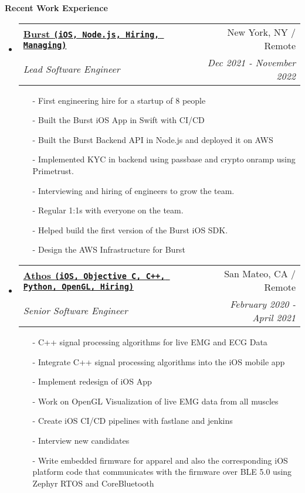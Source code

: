 \documentclass[letterpaper,11pt]{article}
\makeatletter
\newcommand{\resheading}[1]{{\large \colorbox{mygrey}{\begin{minipage}{\textwidth}{\textbf{#1 \vphantom{p\^{E}}}}\end{minipage}}}}
\newcommand{\ressubheading}[4]{
\begin{tabular*}{7.0in}{l@{\extracolsep{\fill}}r}
    \textbf{#1} & #2 \\
    \textit{#3} & \textit{#4} \\
\end{tabular*}\vspace{-6pt}}
\makeatother
\begin{document}
\resheading{Recent Work Experience}
\begin{itemize}

\item
    \ressubheading{\href{https://www.joinburst.com}{Burst \texttt{(iOS, Node.js, Hiring, Managing)}}}{New York, NY / Remote}{Lead Software Engineer}{Dec 2021 - November 2022 }
    \begin{itemize}
        \item[-]{First engineering hire for a startup of 8 people}
        \item[-]{Built the Burst iOS App in Swift with CI/CD}
        \item[-]{Built the Burst Backend API in Node.js and deployed it on AWS}
        \item[-]{Implemented KYC in backend using passbase and crypto onramp using Primetrust.}
        \item[-]{Interviewing and hiring of engineers to grow the team.}
        \item[-]{Regular 1:1s with everyone on the team.}
        \item[-]{Helped build the first version of the Burst iOS SDK.}
        \item[-]{Design the AWS Infrastructure for Burst}
    \end{itemize}


\item
    \ressubheading{\href{https://www.crunchbase.com/organization/athos}{Athos \texttt{(iOS, Objective C, C++, Python, OpenGL, Hiring)}}}{San Mateo, CA / Remote}{Senior Software Engineer}{February 2020 - April 2021}
    \begin{itemize}
        \item[-]{C++ signal processing algorithms for live EMG and ECG Data}
        \item[-]{Integrate C++ signal processing algorithms into the iOS mobile app}
        \item[-]{Implement redesign of iOS App}
        \item[-]{Work on OpenGL Visualization of live EMG data from all muscles}
        \item[-]{Create iOS CI/CD pipelines with fastlane and jenkins}
        \item[-]{Interview new candidates}
        \item[-]{Write embedded firmware for apparel and also the corresponding iOS platform code that communicates with the firmware over BLE 5.0 using Zephyr RTOS and CoreBluetooth}
    \end{itemize}




\end{itemize}
\end{document}
